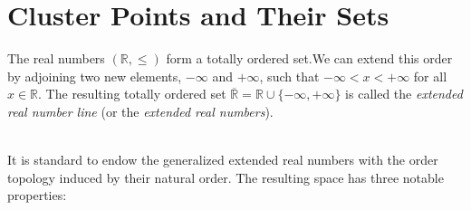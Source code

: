 \documentclass{amsart}
\theoremstyle{definition}
\theoremstyle{plain}
\begin{document}
 
\section{Cluster Points and Their Sets}

The real numbers $(\mathbb{R}, \leq)$ form a totally ordered set.We can extend this order by adjoining two new elements, $-\infty$ and $+\infty$,
such that $-\infty < x < +\infty$ for all $x \in \mathbb{R}$.
The resulting totally ordered set $\overline{\mathbb{R}} = \mathbb{R} \cup \{-\infty, +\infty\}$
is called the \emph{extended real number line} (or the \emph{extended real numbers}).\\ \ \\

\begin{center}
\end{center}


It is standard to endow the generalized extended real numbers with the order topology induced by their natural order.
The resulting space has three notable properties: 
\end{document}
